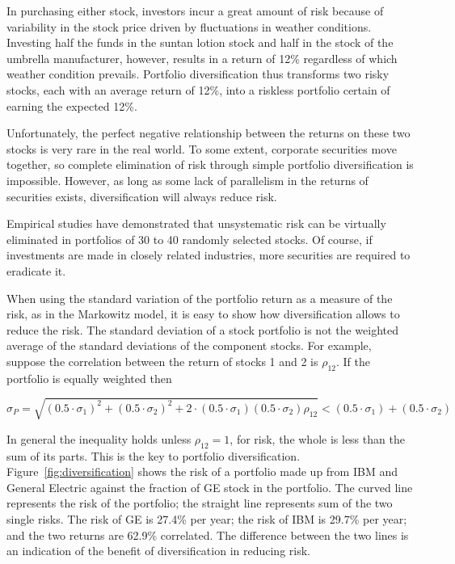 In purchasing either stock, investors incur a great amount of risk because of variability in the stock price driven by fluctuations in weather conditions. Investing half the funds in the suntan lotion stock and half in the stock of the umbrella manufacturer, however, results in a return of 12\% regardless of which weather condition prevails. Portfolio diversification thus transforms two risky stocks, each with an average return of 12\%, into a riskless portfolio certain of earning the expected 12\%.

Unfortunately, the perfect negative relationship between the returns on these two stocks is very rare in the real world. To some extent, corporate securities move together, so complete elimination of risk through simple portfolio diversification is impossible. However, as long as some lack of parallelism in the returns of securities exists, diversification will always reduce risk.

Empirical studies have demonstrated that unsystematic risk can be virtually eliminated in portfolios of 30 to 40 randomly selected stocks. Of course, if investments are made in closely related industries, more securities are required to eradicate it.

When using the standard variation of the portfolio return as a measure of the risk, as in the Markowitz model, it is easy to show how diversification allows to reduce the risk. 
The standard deviation of a stock portfolio is not the weighted average of the standard deviations of the component stocks.
For example, suppose the correlation between the return of stocks 1 and 2 is $\rho_{12}$. If the portfolio is equally weighted then

\begin{equation}
\sigma_{P} = \sqrt{(0.5\cdot\sigma_1 )^2 + (0.5\cdot\sigma_2 )^2 + 2\cdot(0.5\cdot\sigma_1)(0.5\cdot\sigma_2)\rho_{12}} \lt (0.5\cdot\sigma_1 ) + (0.5\cdot\sigma_2 )
\end{equation}

In general the inequality holds unless $\rho_{12}=1$, for risk, the whole is less than the sum of
its parts. This is the key to portfolio diversification. Figure~\ref{fig:diversification} shows the risk of a portfolio made up from IBM and General Electric against the fraction of GE stock in the portfolio. The curved line represents the risk of the portfolio; the straight line represents sum of the two single risks. The risk of GE is 27.4\% per year; the risk of IBM is 29.7\% per year; and the two returns are 62.9\% correlated. The difference between the two lines is an indication of the benefit of diversification in reducing risk.


